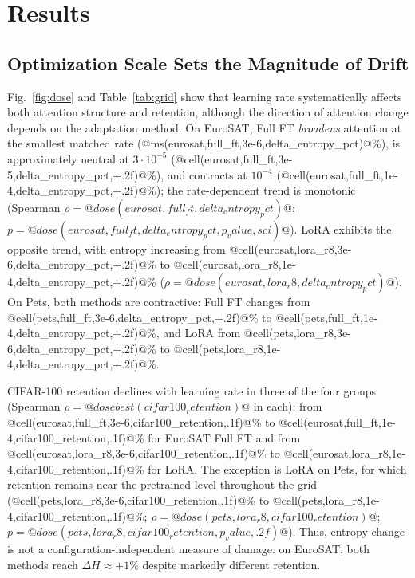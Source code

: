\documentclass[conference]{IEEEtran}
\begin{document}
\section{Results}
\subsection{Optimization Scale Sets the Magnitude of Drift}
Fig.~\ref{fig:dose} and Table~\ref{tab:grid} show that learning rate systematically affects both attention structure and retention, although the direction of attention change depends on the adaptation method. On EuroSAT, Full FT \emph{broadens} attention at the smallest matched rate (@ms(eurosat,full_ft,3e-6,delta_entropy_pct)@\%), is approximately neutral at $3\cdot 10^{-5}$ (@cell(eurosat,full_ft,3e-5,delta_entropy_pct,+.2f)@\%), and contracts at $10^{-4}$ (@cell(eurosat,full_ft,1e-4,delta_entropy_pct,+.2f)@\%); the rate-dependent trend is monotonic (Spearman $\rho=@dose(eurosat,full_ft,delta_entropy_pct)@$; $p=@dose(eurosat,full_ft,delta_entropy_pct,p_value,sci)@$). LoRA exhibits the opposite trend, with entropy increasing from @cell(eurosat,lora_r8,3e-6,delta_entropy_pct,+.2f)@\% to @cell(eurosat,lora_r8,1e-4,delta_entropy_pct,+.2f)@\% ($\rho=@dose(eurosat,lora_r8,delta_entropy_pct)@$). On Pets, both methods are contractive: Full FT changes from @cell(pets,full_ft,3e-6,delta_entropy_pct,+.2f)@\% to @cell(pets,full_ft,1e-4,delta_entropy_pct,+.2f)@\%, and LoRA from @cell(pets,lora_r8,3e-6,delta_entropy_pct,+.2f)@\% to @cell(pets,lora_r8,1e-4,delta_entropy_pct,+.2f)@\%.

CIFAR-100 retention declines with learning rate in three of the four groups (Spearman $\rho=@dosebest(cifar100_retention)@$ in each): from @cell(eurosat,full_ft,3e-6,cifar100_retention,.1f)@\% to @cell(eurosat,full_ft,1e-4,cifar100_retention,.1f)@\% for EuroSAT Full FT and from @cell(eurosat,lora_r8,3e-6,cifar100_retention,.1f)@\% to @cell(eurosat,lora_r8,1e-4,cifar100_retention,.1f)@\% for LoRA. The exception is LoRA on Pets, for which retention remains near the pretrained level throughout the grid (@cell(pets,lora_r8,3e-6,cifar100_retention,.1f)@\% to @cell(pets,lora_r8,1e-4,cifar100_retention,.1f)@\%; $\rho=@dose(pets,lora_r8,cifar100_retention)@$; $p=@dose(pets,lora_r8,cifar100_retention,p_value,.2f)@$). Thus, entropy change is not a configuration-independent measure of damage: on EuroSAT, both methods reach $\Delta H\approx+1\%$ despite markedly different retention.
\end{document}
